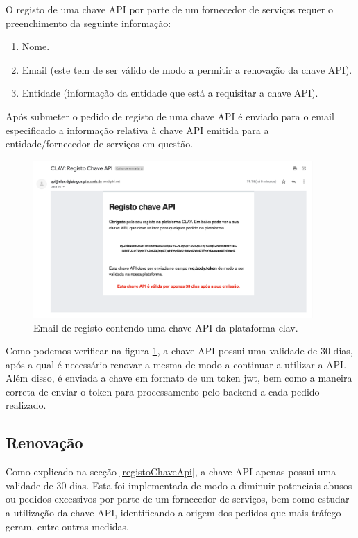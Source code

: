 O registo de uma chave API por parte de um fornecedor de serviços requer o preenchimento da seguinte informação:

\begin{enumerate}
    \item Nome.
    \item Email (este tem de ser válido de modo a permitir a renovação da chave API).
    \item Entidade (informação da entidade que está a requisitar a chave API).
\end{enumerate}

Após submeter o pedido de registo de uma chave API é enviado para o email especificado a informação relativa à chave API emitida para a entidade/fornecedor de serviços em questão.

\begin{figure}[H]
    \centering
    \includegraphics[width=0.95\textwidth]{img/clav/authAPI/emailRegisto.png}
    \caption{Email de registo contendo uma chave API da plataforma \gls{clav}.}
    \label{fig:emailRegistoChaveApi}
\end{figure}

Como podemos verificar na figura \ref{fig:emailRegistoChaveApi}, a chave API possui uma validade de 30 dias, após a qual é necessário renovar a mesma de modo a continuar a utilizar a API. Além disso, é enviada a chave em formato de um token \gls{jwt}, bem como a maneira correta de enviar o token para processamento pelo backend a cada pedido realizado.

\subsection{Renovação}

Como explicado na secção \ref{registoChaveApi}, a chave API apenas possui uma validade de 30 dias. Esta foi implementada de modo a diminuir potenciais abusos ou pedidos excessivos por parte de um fornecedor de serviços, bem como estudar a utilização da chave API, identificando a origem dos pedidos que mais tráfego geram, entre outras medidas.

